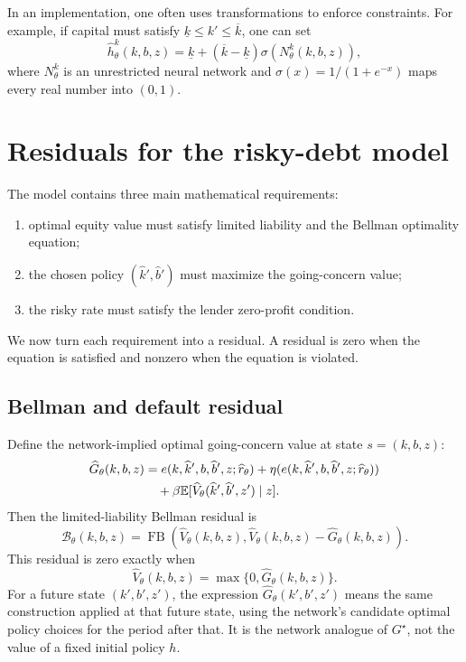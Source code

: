 \documentclass[11pt]{article}
\newcommand{\E}{\mathbb{E}}
\newcommand{\1}{\mathbf{1}}
\begin{document}
In an implementation, one often uses transformations to enforce constraints.
For example, if capital must satisfy \(\underline k\le k'\le \overline k\), one
can set
\[
  \widehat h^k_\theta(k,b,z)
  =
  \underline k+(\overline k-\underline k)\sigma(N^k_\theta(k,b,z)),
\]
where \(N^k_\theta\) is an unrestricted neural network and
\(\sigma(x)=1/(1+e^{-x})\) maps every real number into \((0,1)\).

\section{Residuals for the risky-debt model}

The model contains three main mathematical requirements:
\begin{enumerate}[leftmargin=2em]
  \item optimal equity value must satisfy limited liability and the Bellman
  optimality equation;
  \item the chosen policy \((\widehat k',\widehat b')\) must maximize the
  going-concern value;
  \item the risky rate must satisfy the lender zero-profit condition.
\end{enumerate}
We now turn each requirement into a residual. A residual is zero when the
equation is satisfied and nonzero when the equation is violated.

\subsection{Bellman and default residual}

Define the network-implied optimal going-concern value at state \(s=(k,b,z)\):
\begin{align}
  \widehat G_\theta(k,b,z)
  &=
  e(k,\widehat k',b,\widehat b',z;\widehat r_\theta)
  +\eta(e(k,\widehat k',b,\widehat b',z;\widehat r_\theta)) \notag\\
  &\quad
  +\beta \E[
    \widehat V_\theta(\widehat k',\widehat b',z')
    \mid z].
  \label{eq:network-going-concern}
\end{align}
Then the limited-liability Bellman residual is
\begin{equation}
  \mathcal B_\theta(k,b,z)
  =
  \operatorname{FB}\left(
    \widehat V_\theta(k,b,z),
    \widehat V_\theta(k,b,z)-\widehat G_\theta(k,b,z)
  \right).
  \label{eq:bellman-fb-residual}
\end{equation}
This residual is zero exactly when
\[
  \widehat V_\theta(k,b,z)=\max\{0,\widehat G_\theta(k,b,z)\}.
\]
For a future state \((k',b',z')\), the expression
\(\widehat G_\theta(k',b',z')\) means the same construction applied at that
future state, using the network's candidate optimal policy choices for the
period after that. It is the network analogue of \(G^\star\), not the value of a
fixed initial policy \(h\).
\end{document}
